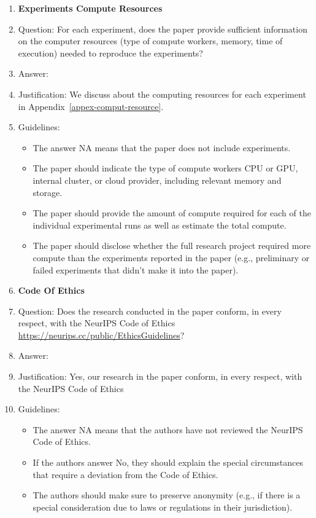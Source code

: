 \documentclass{article}
\theoremstyle{plain}
\theoremstyle{definition}
\theoremstyle{remark}
\begin{document}
\begin{enumerate}
\item {\bf Experiments Compute Resources}
    \item[] Question: For each experiment, does the paper provide sufficient information on the computer resources (type of compute workers, memory, time of execution) needed to reproduce the experiments?
    \item[] Answer: \answerYes{} %
    \item[] Justification:  We discuss about the computing resources for each experiment in Appendix~\ref{appex-comput-resource}.
    \item[] Guidelines:
    \begin{itemize}
        \item The answer NA means that the paper does not include experiments.
        \item The paper should indicate the type of compute workers CPU or GPU, internal cluster, or cloud provider, including relevant memory and storage.
        \item The paper should provide the amount of compute required for each of the individual experimental runs as well as estimate the total compute. 
        \item The paper should disclose whether the full research project required more compute than the experiments reported in the paper (e.g., preliminary or failed experiments that didn't make it into the paper). 
    \end{itemize}
    
\item {\bf Code Of Ethics}
    \item[] Question: Does the research conducted in the paper conform, in every respect, with the NeurIPS Code of Ethics \url{https://neurips.cc/public/EthicsGuidelines}?
    \item[] Answer: \answerYes{} %
    \item[] Justification: 
Yes, our research in the paper conform, in every respect, with the NeurIPS Code of Ethics 
    \item[] Guidelines:
    \begin{itemize}
        \item The answer NA means that the authors have not reviewed the NeurIPS Code of Ethics.
        \item If the authors answer No, they should explain the special circumstances that require a deviation from the Code of Ethics.
        \item The authors should make sure to preserve anonymity (e.g., if there is a special consideration due to laws or regulations in their jurisdiction).
    \end{itemize}



\end{enumerate}
\end{document}
